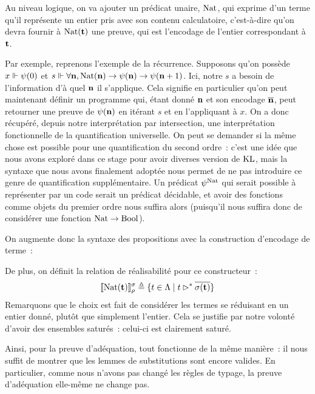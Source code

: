\documentclass{article}
\begin{document}
Au niveau logique, on va ajouter un prédicat unaire, $\Nat$, qui exprime d'un terme qu'il représente un entier pris avec son contenu calculatoire, c'est-à-dire qu'on devra fournir à $\Nat(\bt)$ une preuve, qui est l'encodage de l'entier correspondant à $\bt$.

Par exemple, reprenons l'exemple de la récurrence. Supposons qu'on possède $x\reali \psi(0)$ et $s\reali \forall \bn, \Nat(\bn) \to \psi(\bn) \to \psi(\bn+1)$. Ici, notre $s$ a besoin de l'information d'à quel $\bn$ il s'applique. Cela signifie en particulier qu'on peut maintenant définir un programme qui, étant donné $\bn$ et son encodage $\overline{\bn}$, peut retourner une preuve de $\psi(\bn)$ en itérant $s$ et en l'appliquant à $x$. On a donc récupéré, depuis notre interprétation par intersection, une interprétation fonctionnelle de la quantification universelle. On peut se demander si la même chose est possible pour une quantification du second ordre~: c'est une idée que nous avons exploré dans ce stage pour avoir diverses version de $\KL$, mais la syntaxe que nous avons finalement adoptée nous permet de ne pas introduire ce genre de quantification supplémentaire. Un prédicat $\psi^{\Nat}$ qui serait possible à représenter par un code serait un prédicat décidable, et avoir des fonctions comme objets du premier ordre nous suffira alors (puisqu'il nous suffira donc de considérer une fonction $\Nat\to\Bool$).

On augmente donc la syntaxe des propositions avec la construction d'encodage de terme~:
\begin{center}
    \begin{prooftree}
    \end{prooftree}
\end{center}

De plus, on définit la relation de réalisabilité pour ce constructeur~:
\[\trad{\Nat(\bt)}_\rho^\sigma \defeq \{t\in \Lambda\mid t \rhd^* \overline{\sigma(\bt)}\}\]
Remarquons que le choix est fait de considérer les termes se réduisant en un entier donné, plutôt que simplement l'entier. Cela se justifie par notre volonté d'avoir des ensembles saturés~: celui-ci est clairement saturé.

Ainsi, pour la preuve d'adéquation, tout fonctionne de la même manière~: il nous suffit de montrer que les lemmes de substitutions sont encore valides. En particulier, comme nous n'avons pas changé les règles de typage, la preuve d'adéquation elle-même ne change pas.
\end{document}
